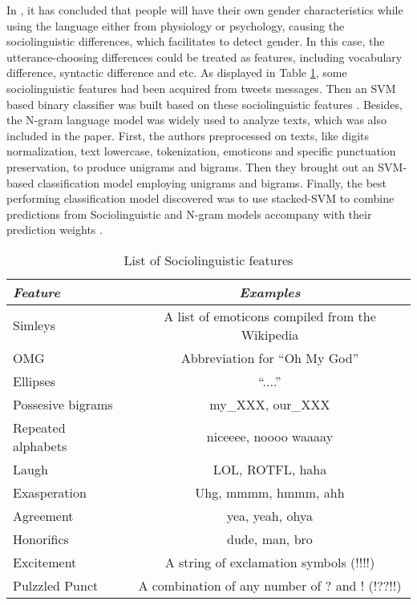 \documentclass[runningheads]{llncs}
\begin{document}
	In \cite{jinyu2014study}, it has concluded that people will have their own gender characteristics while using the language either from physiology or psychology, causing the sociolinguistic differences, which facilitates to detect gender. In this case, the utterance-choosing differences could be treated as features, including vocabulary difference, syntactic difference and etc. As displayed in Table \ref{table:linguistic-feature}, some sociolinguistic features had been acquired from tweets messages. Then an SVM \cite{suykens1999least}based binary classifier was built based on these sociolinguistic features \cite{rao2010classifying}. Besides, the N-gram language model was widely used to analyze texts, which was also included in the paper. First, the authors preprocessed on texts, like digits normalization, text lowercase, tokenization, emoticons and specific punctuation preservation, to produce unigrams and bigrams. Then they brought out an SVM-based classification model employing unigrams and bigrams. Finally, the best performing classification model discovered was to use stacked-SVM to combine predictions from Sociolinguistic and N-gram models accompany with their prediction weights  \cite{rao2010classifying}.
	
	\begin{table}
		\caption{List of Sociolinguistic features  \cite{rao2010classifying}}
		\centering
		\begin{tabular}{| l | c |}
			\hline
			\textit{Feature} & \textit{Examples} \\
			\hline
			Simleys & A list of emoticons compiled from the Wikipedia\\
			OMG & Abbreviation for \enquote{Oh My God}  \\
			Ellipses &  \enquote{....}\\
			Possesive bigrams & my\_XXX, our\_XXX \\
			Repeated alphabets & niceeee, noooo waaaay \\
			Laugh & LOL, ROTFL, haha \\
			Exasperation & Uhg, mmmm, hmmm, ahh \\
			Agreement & yea, yeah, ohya \\
			Honorifics &  dude, man, bro\\
			Excitement &  A string of exclamation symbols (!!!!)\\
			Pulzzled Punct &  A combination of any number of ? and ! (!??!!)\\
			\hline
		\end{tabular}
		\label{table:linguistic-feature}
	\end{table}
	
\end{document}
